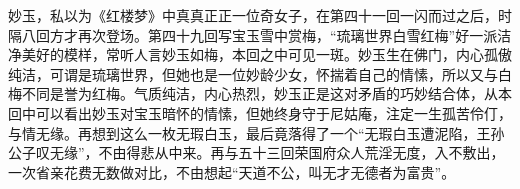 %
\begin{solution}
    \large 妙玉，私以为《红楼梦》中真真正正一位奇女子，在第四十一回一闪而过之后，时隔八回方才再次登场。第四十九回写宝玉雪中赏梅，“琉璃世界白雪红梅”好一派洁净美好的模样，常听人言妙玉如梅，本回之中可见一斑。妙玉生在佛门，内心孤傲纯洁，可谓是琉璃世界，但她也是一位妙龄少女，怀揣着自己的情愫，所以又与白梅不同是誉为红梅。气质纯洁，内心热烈，妙玉正是这对矛盾的巧妙结合体，从本回中可以看出妙玉对宝玉暗怀的情愫，但她终身守于尼姑庵，注定一生孤苦伶仃，与情无缘。再想到这么一枚无瑕白玉，最后竟落得了一个“无瑕白玉遭泥陷，王孙公子叹无缘”，不由得悲从中来。再与五十三回荣国府众人荒淫无度，入不敷出，一次省亲花费无数做对比，不由想起“天道不公，叫无才无德者为富贵”。
\end{solution}


%



%



%



%

